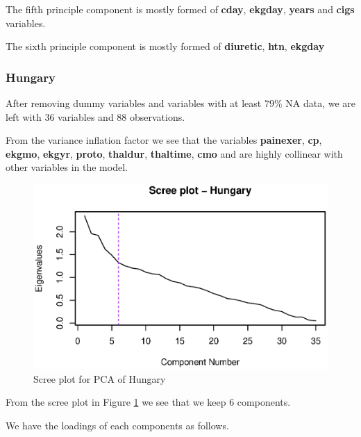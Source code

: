 \documentclass[a4paper]{article}
\begin{document}
The fifth principle component is mostly formed of \textbf{cday}, \textbf{ekgday}, \textbf{years} and \textbf{cigs} variables.

The sixth principle component is mostly formed of \textbf{diuretic}, \textbf{htn}, \textbf{ekgday}

\subsubsection{Hungary}

After removing dummy variables and variables with at least $79\%$ NA data, we are left with 36 variables and 88 observations. 



From the variance inflation factor we see that the variables \textbf{painexer}, \textbf{cp}, \textbf{ekgmo}, \textbf{ekgyr}, \textbf{proto}, \textbf{thaldur}, \textbf{thaltime}, \textbf{cmo} and  are highly collinear with other variables in the model.

\begin{figure}[H]
	\begin{center}
		\includegraphics[width=12cm]{question3output/hunscreeplot.eps}
	\end{center}
	\caption{Scree plot for PCA of Hungary}
	\label{q3-hun-screeplot}
\end{figure}

From the scree plot in Figure \ref{q3-hun-screeplot} we see that we keep 6 components.

We have the loadings of each components as follows.


\end{document}
